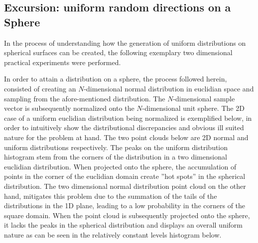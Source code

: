 \subsection{Excursion: uniform random directions on a Sphere}\label{uniformPoints}

In the process of understanding how the generation of uniform distributions on
spherical surfaces can be created, the following exemplary two dimensional practical
experiments were performed.

In order to attain a distribution on a sphere, the process followed herein,
consisted of creating an $N$-dimensional normal distribution in euclidian space and
sampling from the afore-mentioned distribution.  The $N$-dimensional sample vector
is subsequently normalized onto the $N$-dimensional unit sphere.
The 2D case of a uniform
euclidian distribution being normalized is exemplified below, in order to intuitively
show the distributional discrepancies and obvious ill suited nature for the problem
at hand.  The two point clouds below are 2D normal and uniform distributions
respectively.  The peaks on the uniform distribution histogram stem from the corners
of the distribution in a two dimensional euclidian distribution.  When projected onto
the sphere, the accumulation of points in the corner of the euclidian domain create
''hot spots'' in the spherical distribution.  The two dimensional normal
distribution point cloud on the other hand, mitigates this problem due to the summation
of the tails of the distributions in the 1D plane, leading to a low probability
in the corners of the square domain.  When the point cloud  is subsequently projected
onto the sphere, it lacks the peaks in the  spherical distribution and displays an
overall uniform nature as can be seen in the relatively constant levels  histogram below.

